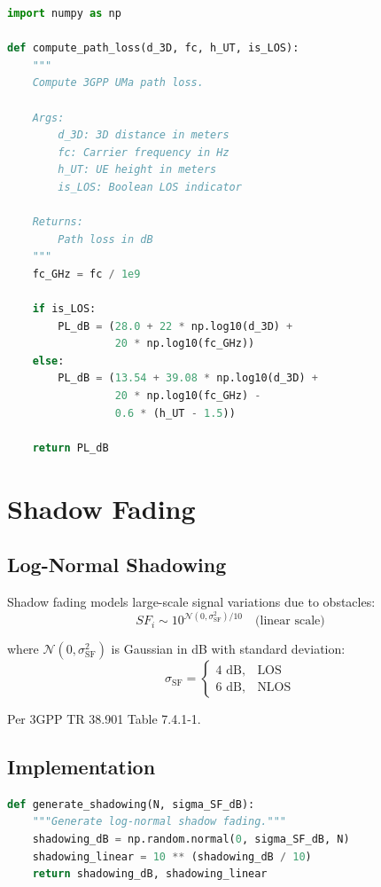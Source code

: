 \begin{lstlisting}[language=Python, caption={Path Loss Calculation}]
import numpy as np

def compute_path_loss(d_3D, fc, h_UT, is_LOS):
    """
    Compute 3GPP UMa path loss.
    
    Args:
        d_3D: 3D distance in meters
        fc: Carrier frequency in Hz
        h_UT: UE height in meters
        is_LOS: Boolean LOS indicator
    
    Returns:
        Path loss in dB
    """
    fc_GHz = fc / 1e9
    
    if is_LOS:
        PL_dB = (28.0 + 22 * np.log10(d_3D) + 
                 20 * np.log10(fc_GHz))
    else:
        PL_dB = (13.54 + 39.08 * np.log10(d_3D) + 
                 20 * np.log10(fc_GHz) - 
                 0.6 * (h_UT - 1.5))
    
    return PL_dB
\end{lstlisting}

\section{Shadow Fading}

\subsection{Log-Normal Shadowing}

Shadow fading models large-scale signal variations due to obstacles:
\begin{equation}
SF_i \sim 10^{\mathcal{N}(0, \sigma_{\text{SF}}^2) / 10} \quad \text{(linear scale)}
\end{equation}

where $\mathcal{N}(0, \sigma_{\text{SF}}^2)$ is Gaussian in dB with standard deviation:
\begin{equation}
\sigma_{\text{SF}} = \begin{cases}
4 \text{ dB}, & \text{LOS} \\
6 \text{ dB}, & \text{NLOS}
\end{cases}
\end{equation}

Per 3GPP TR 38.901 Table 7.4.1-1.

\subsection{Implementation}

\begin{lstlisting}[language=Python, caption={Shadow Fading Generation}]
def generate_shadowing(N, sigma_SF_dB):
    """Generate log-normal shadow fading."""
    shadowing_dB = np.random.normal(0, sigma_SF_dB, N)
    shadowing_linear = 10 ** (shadowing_dB / 10)
    return shadowing_dB, shadowing_linear
\end{lstlisting}

